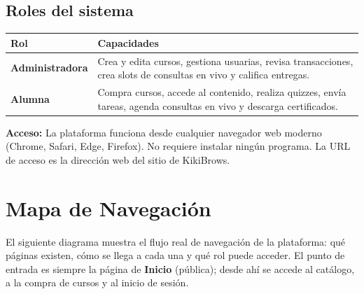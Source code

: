 \documentclass[a4paper,11pt]{article}
\begin{document}
\subsection*{Roles del sistema}

\begin{center}
\renewcommand{\arraystretch}{1.4}
\begin{tabular}{L{3cm} L{11.5cm}}
\toprule
\textbf{Rol} & \textbf{Capacidades} \\
\midrule
\textbf{Administradora} &
  Crea y edita cursos, gestiona usuarias, revisa transacciones,
  crea slots de consultas en vivo y califica entregas. \\
\textbf{Alumna} &
  Compra cursos, accede al contenido, realiza quizzes, env\'ia tareas,
  agenda consultas en vivo y descarga certificados. \\
\bottomrule
\end{tabular}
\end{center}

\begin{infobox}
\textbf{Acceso:} La plataforma funciona desde cualquier navegador web moderno
(Chrome, Safari, Edge, Firefox). No requiere instalar ning\'un programa.
La URL de acceso es la direcci\'on web del sitio de KikiBrows.
\end{infobox}

\section{Mapa de Navegaci\'on}

El siguiente diagrama muestra el flujo real de navegaci\'on de la plataforma:
qu\'e p\'aginas existen, c\'omo se llega a cada una y qu\'e rol puede acceder.
El punto de entrada es siempre la p\'agina de \textbf{Inicio} (p\'ublica);
desde ah\'i se accede al cat\'alogo, a la compra de cursos y al inicio de sesi\'on.
\end{document}
